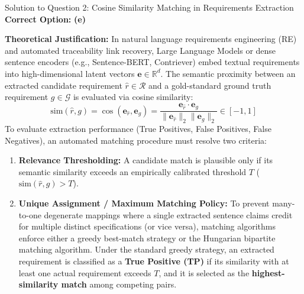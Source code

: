\documentclass[11pt,a4paper]{article}
\begin{document}
\begin{solutionbox}{Solution to Question 2: Cosine Similarity Matching in Requirements Extraction}
\textbf{Correct Option:} \textbf{(e)}

\medskip
\textbf{Theoretical Justification:}
In natural language requirements engineering (RE) and automated traceability link recovery, Large Language Models or dense sentence encoders (e.g., Sentence-BERT, Contriever) embed textual requirements into high-dimensional latent vectors $\mathbf{e} \in \mathbb{R}^d$. The semantic proximity between an extracted candidate requirement $\hat{r} \in \mathcal{R}$ and a gold-standard ground truth requirement $g \in \mathcal{G}$ is evaluated via cosine similarity:
\begin{equation}
    \text{sim}(\hat{r}, g) = \cos(\mathbf{e}_{\hat{r}}, \mathbf{e}_g) = \frac{\mathbf{e}_{\hat{r}} \cdot \mathbf{e}_g}{\|\mathbf{e}_{\hat{r}}\|_2 \|\mathbf{e}_g\|_2} \in [-1, 1]
\end{equation}
To evaluate extraction performance (True Positives, False Positives, False Negatives), an automated matching procedure must resolve two criteria:
\begin{enumerate}[label=\arabic*.]
    \item \textbf{Relevance Thresholding:} A candidate match is plausible only if its semantic similarity exceeds an empirically calibrated threshold $T$ ($\text{sim}(\hat{r}, g) > T$).
    \item \textbf{Unique Assignment / Maximum Matching Policy:} To prevent many-to-one degenerate mappings where a single extracted sentence claims credit for multiple distinct specifications (or vice versa), matching algorithms enforce either a greedy best-match strategy or the Hungarian bipartite matching algorithm. Under the standard greedy strategy, an extracted requirement is classified as a \textbf{True Positive (TP)} if its similarity with at least one actual requirement exceeds $T$, and it is selected as the \textbf{highest-similarity match} among competing pairs.
\end{enumerate}


\end{solutionbox}
\end{document}
